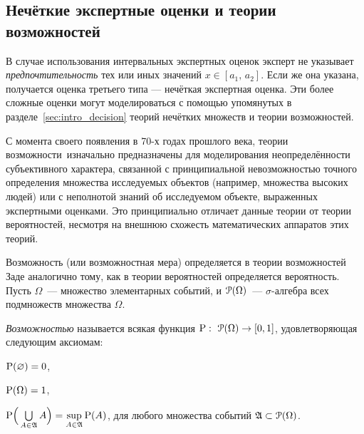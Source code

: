 \subsection{Нечёткие экспертные оценки и теории возможностей}

В случае использования интервальных экспертных оценок эксперт не указывает {\sl предпочтительность} тех или иных значений $x \in [a_1,\, a_2]$. Если же она указана, получается оценка третьего типа --- нечёткая экспертная оценка. Эти более сложные оценки могут моделироваться с помощью упомянутых в разделе~\ref{sec:intro_decision} теорий нечётких множеств и теории возможностей.


С момента своего появления в 70-х годах прошлого века, теории возможности\ изначально предназначены для моделирования неопределённости субъективного характера, связанной с принципиальной невозможностью точного определения множества исследуемых объектов (например, множества высоких людей) или с неполнотой знаний об исследуемом объекте, выраженных экспертными оценками. Это принципиально отличает данные теории от теории вероятностей, несмотря на внешнюю схожесть математических аппаратов этих теорий. 

Возможность (или возможностная мера) определяется в теории возможностей Заде \cite{citeZadeh, dubois_prade-1990} аналогично тому, как в теории вероятностей определяется вероятность. Пусть $\Omega$~--- множество элементарных событий, и $\Po(\Omega)$~--- $\sigma$-алгебра всех подмножеств множества $\Omega$.
\begin{definition}
\label{def_possibility}
\emph{Возможностью} называется всякая функция $\P:\ \Po(\Omega)\to[0,1]$, удовлетворяющая следующим аксиомам:
\begin{compactenum}
\item $\P(\varnothing) = 0$,\label{axiom_P1}
\item $\P(\Omega) = 1$,\label{axiom_P2}
\item $\P\Big(\bigcup\limits_{A\in\Alg} A\Big) = \sup\limits_{A\in\Alg}\P(A)$, для любого множества событий $\Alg\subset\Po(\Omega)$.\label{axiom_P3}
\end{compactenum}
\end{definition}

